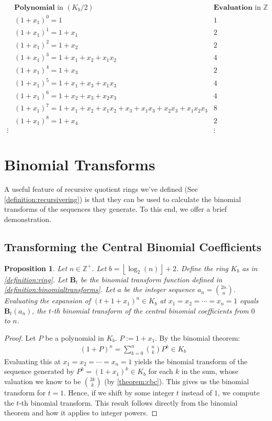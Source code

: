 \documentclass{article}
\theoremstyle{plain}
\theoremstyle{definition}
\newtheorem{proposition}{Proposition}
\newcommand{\floor}[1]{\left\lfloor #1 \right\rfloor}
\newcommand{\Z}{\mathbb{Z}}
\newcommand{\K}{K}
\newcommand{\BT}{\textbf{B}}
\begin{document}
\small
\begin{align*}
& \textbf{Polynomial} \text{ in } (\K_b/2) & \textbf{Evaluation} \text{ in } \Z \\ 
& (1+x_1)^0 = 1 & 1 \\
& (1+x_1)^1 = 1+x_1 & 2 \\
& (1+x_1)^2 = 1+x_2 & 2 \\
& (1+x_1)^3 = 1+x_1+x_2+x_1x_2 & 4 \\
& (1+x_1)^4 = 1+x_3 & 2 \\
& (1+x_1)^5 = 1+x_1+x_3+x_1x_3 & 4 \\
& (1+x_1)^6 = 1+x_2+x_3+x_2x_3 & 4 \\
& (1+x_1)^7 = 1+x_1+x_2+x_1x_2+x_3+x_1x_3+x_2x_3+x_1x_2x_3 & 8 \\
& (1+x_1)^8 = 1+x_4 & 2 \\
\vdots & & \vdots
\end{align*}
\normalsize

\section{Binomial Transforms}
A useful feature of recursive quotient rings we've defined (See \cref{definition:recursivering}) is that they can be used to calculate the binomial transforms of the sequences they generate. To this end, we offer a brief demonstration.

\subsection{Transforming the Central Binomial Coefficients}
\begin{proposition} \label{proposition:binomialtransforms}
\textit{
Let $n \in \Z^+$. Let $b={\floor{\log_2(n)}+2}$. Define the ring $\K_b$ as in \cref{definition:ring}. Let $\BT_t$ be the binomial transform function defined in \cref{definition:binomialtransforms}. Let $a$ be the integer sequence $a_n=\binom{2n}{n}$. Evaluating the expansion of $(t + 1 + x_1)^n \in \K_b$ at $x_1=x_2=\cdots=x_n=1$ equals $\BT_t(a_n)$, the $t$-th binomial transform of the central binomial coefficients from $0$ to $n$.
}
\end{proposition}
\begin{proof}
Let $P$ be a polynomial in $\K_b$. $P := 1 + x_1$. By the binomial theorem:
\begin{align*}
    (1 + P)^n = \sum_{k=0}^{n} \binom{n}{k} P^k \in \K_b
\end{align*}
Evaluating this at $x_1=x_2=\cdots=x_n=1$ yields the binomial transform of the sequence generated by $P^k = (1 + x_1)^k \in \K_b$ for each $k$ in the sum, whose valuation we know to be $\binom{2k}{k}$ (by \cref{theorem:cbc}). This gives us the binomial transform for $t=1$. Hence, if we shift by some integer $t$ instead of $1$, we compute the $t$-th binomial transform. This result follows directly from the binomial theorem and how it applies to integer powers.
\end{proof}
\end{document}
